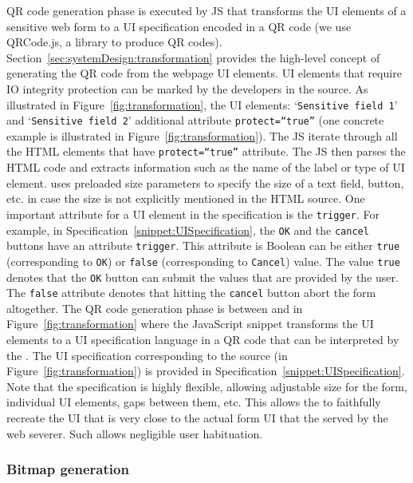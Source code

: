 QR code generation phase is executed by \name JS that transforms the UI elements of a sensitive web form to a UI specification encoded in a QR code (we use QRCode.js, a \js library to produce QR codes). Section~\ref{sec:systemDesign:transformation} provides the high-level concept of generating the QR code from the webpage UI elements. UI elements that require IO integrity protection can be marked by the developers in the \html source. As illustrated in Figure~\ref{fig:transformation}, the \html UI elements: `\texttt{Sensitive field 1}' and `\texttt{Sensitive field 2}' additional attribute \texttt{protect=``true''} (one concrete example is illustrated in Figure~\ref{fig:transformation}). The \name JS iterate through all the HTML elements that have \texttt{protect=``true''} attribute. The JS then parses the HTML code and extracts information such as the name of the label or type of UI element. \device uses preloaded size parameters to specify the size of a text field, button, etc. in case the size is not explicitly mentioned in the HTML source. One important attribute for a UI element in the specification is the \texttt{trigger}. For example, in Specification~\ref{snippet:UISpecification}, the \texttt{OK} and the \texttt{cancel} buttons have an attribute \texttt{trigger}. This attribute is Boolean can be either \texttt{true} (corresponding to \texttt{OK}) or \texttt{false} (corresponding to \texttt{Cancel}) value. The value \texttt{true} denotes that the \texttt{OK} button can submit the values that are provided by the user. The \texttt{false} attribute denotes that hitting the \texttt{cancel} button abort the form altogether. The QR code generation phase is between \one and \two in Figure~\ref{fig:transformation} where the \name JavaScript snippet transforms the UI elements to a UI specification language in a QR code that can be interpreted by the \device. The UI specification corresponding to the \html source (in Figure~\ref{fig:transformation}) is provided in Specification~\ref{snippet:UISpecification}. Note that the specification is highly flexible, allowing adjustable size for the form, individual UI elements, gaps between them, etc. This allows the \device to faithfully recreate the UI that is very close to the actual form UI that the served by the web severer. Such allows negligible user habituation. 

\subsubsection{\bfseries Bitmap generation}
\label{sec:prototype:impl:bitmap}

